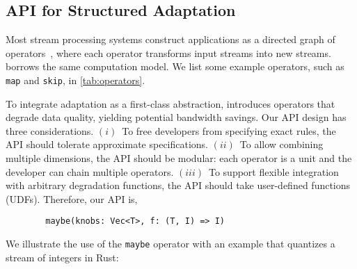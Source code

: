 \subsection{API for Structured Adaptation}
\label{sec:struct-adapt}

Most stream processing systems construct applications as a directed graph of
operators~\cite{toshniwal2014storm, zaharia2013discretized}, where each operator
transforms input streams into new streams. \sysname{} borrows the same
computation model. We list some example operators, such as \texttt{map} and
\texttt{skip}, in \autoref{tab:operators}.

To integrate adaptation as a first-class abstraction, \sysname{} introduces \maybe{} operators
that degrade data quality, yielding potential bandwidth savings.
Our API design has three considerations.
$(i)$~To free developers from specifying exact rules, the API should tolerate
approximate specifications. $(ii)$~To allow combining multiple dimensions, the API
should be modular: each operator is a unit and the developer can chain multiple
operators. $(iii)$~To support flexible integration with arbitrary degradation
functions, the API should take user-defined functions (UDFs). Therefore, our API
is,

\vspace{-2pt}
\begin{lstlisting}
        maybe(knobs: Vec<T>, f: (T, I) => I)
\end{lstlisting}

We illustrate the use of the \texttt{maybe} operator with an example that
quantizes a stream of integers in Rust:

